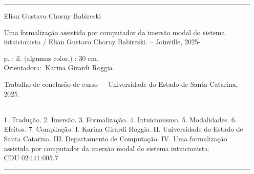 	\vspace*{\fill}					%
	\hrule							%
	\begin{center}					%
	\begin{minipage}[c]{12.5cm}		%
	
	Elian Gustavo Chorny Babireski
	
	\hspace{0.5cm} Uma formalização assistida por computador da imersão modal do sistema intuicionista  / Elian Gustavo Chorny Babireski. --
	Joinville, 2025-
	
	\hspace{0.5cm} \pageref{LastPage} p. : il. (algumas color.) ; 30 cm.\\
	
	\hspace{0.5cm} Orientadora:~Karina Girardi Roggia\\
	
	\hspace{0.5cm}
	\parbox[t]{\textwidth}{Trabalho de conclusão de curso~--~Universidade do Estado de Santa Catarina,
	2025.}\\
	
	\hspace{0.5cm}
		1. Tradução.
		2. Imersão.
        3. Formalização.
        4. Intuicionismo.
        5. Modalidades.
        6. Efeitos.
        7. Compilação.
		I. Karina Girardi Roggia.
		II. Universidade do Estado de Santa Catarina.
		III. Departamento de Computação.
		IV. Uma formalização assistida por computador da imersão modal do sistema intuicionista.\\ 			
	
	\hspace{8.75cm} CDU 02:141:005.7\\
	
	\end{minipage}
	\end{center}
	\hrule